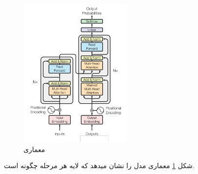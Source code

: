 \begin{figure}[H]
	\centering
	\includegraphics[width=0.5\textwidth]{figures/Transformer.png}
	\caption{معماری }
	\label{fig:Transformer}
\end{figure}
شکل \ref{fig:Transformer} معماری مدل  را نشان میدهد که لایه هر مرحله چگونه است.
\cite{vaswani2017attention}

